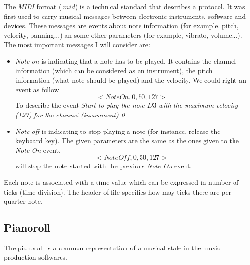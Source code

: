\documentclass[12pt]{report}
\begin{document}


The \textit{MIDI} format ($.mid$) is a technical standard that describes a protocol.
It was first used to carry musical messages between electronic instruments, software and devices. These messages are events about note information (for example, pitch, velocity, panning...) an some other parameters (for example, vibrato, volume...). 
The most important messages I will consider are:
\begin{itemize}
    \item \textit{Note on} is indicating that a note has to be played. It contains the channel information (which can be considered as an instrument), the pitch information (what note should be played) and the velocity. We could right an event as follow :
    \begin{equation}
        <NoteOn, 0, 50, 127>
    \end{equation}
    To describe the event \textit{Start to play the note $D3$ with the maximum velocity (127) for the channel (instrument) 0}
    \item \textit{Note off} is indicating to stop playing a note (for instance, release the keyboard key). The given parameters are the same as the ones given to the \textit{Note On} event.
    \begin{equation}
        <NoteOff, 0, 50, 127>
    \end{equation}
    will stop the note started with the previous \textit{Note On} event.
\end{itemize}

Each note is associated with a time value which can be expressed in number of ticks (time division). The header of file specifies how may ticks there are per quarter note.

\subsection{Pianoroll}

The pianoroll is a common representation of a musical stale in the music production softwares.
\end{document}
